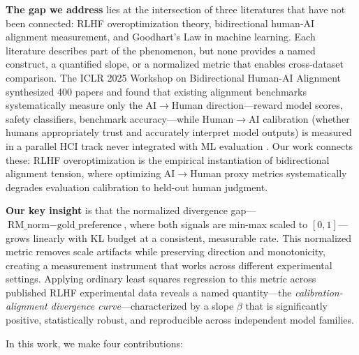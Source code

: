 \textbf{The gap we address} lies at the intersection of three literatures that have not been connected: RLHF overoptimization theory, bidirectional human-AI alignment measurement, and Goodhart's Law in machine learning. Each literature describes part of the phenomenon, but none provides a named construct, a quantified slope, or a normalized metric that enables cross-dataset comparison. The ICLR 2025 Workshop on Bidirectional Human-AI Alignment synthesized 400 papers and found that existing alignment benchmarks systematically measure only the AI$\to$Human direction---reward model scores, safety classifiers, benchmark accuracy---while Human$\to$AI calibration (whether humans appropriately trust and accurately interpret model outputs) is measured in a parallel HCI track never integrated with ML evaluation \cite{ICLR2025Bidirectional}. Our work connects these: RLHF overoptimization is the empirical instantiation of bidirectional alignment tension, where optimizing AI$\to$Human proxy metrics systematically degrades evaluation calibration to held-out human judgment.

\textbf{Our key insight} is that the normalized divergence gap---$\text{RM\_norm} - \text{gold\_preference}$, where both signals are min-max scaled to $[0,1]$---grows linearly with KL budget at a consistent, measurable rate. This normalized metric removes scale artifacts while preserving direction and monotonicity, creating a measurement instrument that works across different experimental settings. Applying ordinary least squares regression to this metric across published RLHF experimental data reveals a named quantity---the \emph{calibration-alignment divergence curve}---characterized by a slope $\beta$ that is significantly positive, statistically robust, and reproducible across independent model families.

In this work, we make four contributions:


